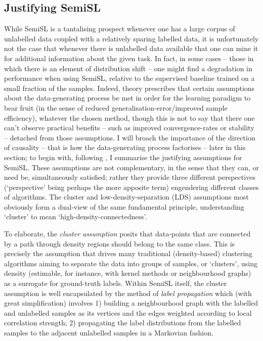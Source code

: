 \subsection{Justifying \acl{SemiSL}}\label{ssec:assumptions}
While \ac{SemiSL} is a tantalising prospect whenever one has a large corpus of unlabelled data
coupled with a relatively sparing labelled data, it is unfortunately not the case that whenever
there is unlabelled data available that one can mine it for additional information about the given
task. 
%
In fact, in some cases -- those in which there is an element of distribution shift -- one might
find a degradation in performance when using \ac{SemiSL}, relative to the supervised baseline trained on
a small fraction of the samples.
%
Indeed, theory prescribes that certain assumptions about the data-generating process be met in
order for the learning paradigm to bear fruit (in the sense of reduced
generalisation-error/improved sample efficiency), whatever the chosen method, though this is not to
say that there one can't observe practical benefits -- such as improved convergence-rates or
stability -- detached from those assumptions.
%
I will broach the importance of the direction of causality -- that is how the data-generating
process factorises -- later in this section; to begin with, following \citep{chapelle2009semi}, I
summarise the justifying assumptions for \ac{SemiSL}.
%
These assumptions are not complementary, in the sense that they can, or need be, simultaneously
satisfied; rather they provide three different perspectives (`perspective' being perhaps the more
apposite term) engendering different classes of algorithms. 
%
The cluster and low-density-separation (LDS) assumptions most obviously form a dual-view of the same
fundamental principle, understanding `cluster' to mean `high-density-connectedness'.
%

%
To elaborate, the \emph{cluster assumption} posits that data-points that are connected by a path
through density regions should belong to the same class.
%
%
This is precisely the assumption that drives many traditional (density-based) clustering algorithms
aiming to separate the data into groups of samples, or `clusters', using density (estimable, for
instance, with kernel methods or neighbourhood graphs) as a surrogate for ground-truth labels.
%
Within \ac{SemiSL} itself, the cluster assumption is well encapsulated by the method of \emph{label
propagation} \citep{szummer2001partially} which (with great simplification) involves 1) building a
neighbourhood graph with the labelled and unlabelled samples as its vertices and the edges weighted
according to local correlation strength; 2) propagating the label distributions from the labelled
samples to the adjacent unlabelled samples in a Markovian fashion.
%

